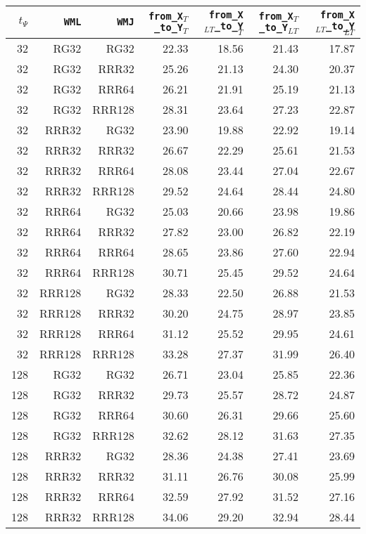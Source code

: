\begin{table}
\begin{tabular}{|r|r|r|r|r|r|r|}
\hline
$t_{\Psi}$ & \texttt{WML} & \texttt{WMJ} & \texttt{from\_X$_{T}$\_to\_Y$_{T}$} & \texttt{from\_X$_{LT}$\_to\_Y$_{T}$} & \texttt{from\_X$_{T}$\_to\_Y$_{LT}$} & \texttt{from\_X$_{LT}$\_to\_Y$_{LT}$} \\
\hline
32 & RG32 & RG32 & 22.33 & 18.56 & 21.43 & 17.87 \\
32 & RG32 & RRR32 & 25.26 & 21.13 & 24.30 & 20.37 \\
32 & RG32 & RRR64 & 26.21 & 21.91 & 25.19 & 21.13 \\
32 & RG32 & RRR128 & 28.31 & 23.64 & 27.23 & 22.87 \\
32 & RRR32 & RG32 & 23.90 & 19.88 & 22.92 & 19.14 \\
32 & RRR32 & RRR32 & 26.67 & 22.29 & 25.61 & 21.53 \\
32 & RRR32 & RRR64 & 28.08 & 23.44 & 27.04 & 22.67 \\
32 & RRR32 & RRR128 & 29.52 & 24.64 & 28.44 & 24.80 \\
32 & RRR64 & RG32 & 25.03 & 20.66 & 23.98 & 19.86 \\
32 & RRR64 & RRR32 & 27.82 & 23.00 & 26.82 & 22.19 \\
32 & RRR64 & RRR64 & 28.65 & 23.86 & 27.60 & 22.94 \\
32 & RRR64 & RRR128 & 30.71 & 25.45 & 29.52 & 24.64 \\
32 & RRR128 & RG32 & 28.33 & 22.50 & 26.88 & 21.53 \\
32 & RRR128 & RRR32 & 30.20 & 24.75 & 28.97 & 23.85 \\
32 & RRR128 & RRR64 & 31.12 & 25.52 & 29.95 & 24.61 \\
32 & RRR128 & RRR128 & 33.28 & 27.37 & 31.99 & 26.40 \\
128 & RG32 & RG32 & 26.71 & 23.04 & 25.85 & 22.36 \\
128 & RG32 & RRR32 & 29.73 & 25.57 & 28.72 & 24.87 \\
128 & RG32 & RRR64 & 30.60 & 26.31 & 29.66 & 25.60 \\
128 & RG32 & RRR128 & 32.62 & 28.12 & 31.63 & 27.35 \\
128 & RRR32 & RG32 & 28.36 & 24.38 & 27.41 & 23.69 \\
128 & RRR32 & RRR32 & 31.11 & 26.76 & 30.08 & 25.99 \\
128 & RRR32 & RRR64 & 32.59 & 27.92 & 31.52 & 27.16 \\
128 & RRR32 & RRR128 & 34.06 & 29.20 & 32.94 & 28.44 \\

\end{tabular}
\end{table}
